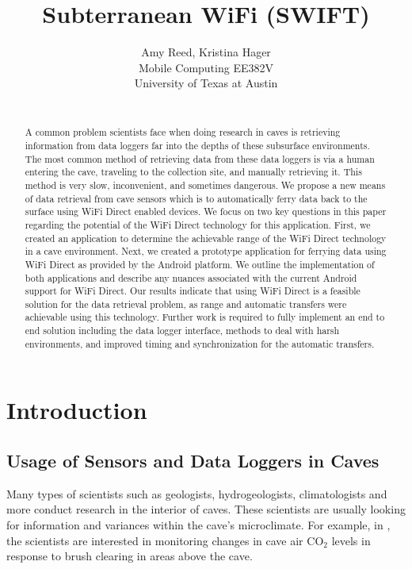 \documentclass[10pt,twocolumn]{article}
\begin{document}
\title{Subterranean WiFi (SWIFT)}

\author{Amy Reed, Kristina Hager\\
Mobile Computing EE382V\\
University of Texas at Austin\\
\\
}

\maketitle
\thispagestyle{empty}

\begin{abstract}
	A common problem scientists face when doing research in caves 
	is retrieving information from data loggers far into the depths of these subsurface environments.
	The most common method of retrieving data from these data loggers is via a human entering 
	the cave, traveling to the collection site, and manually retrieving it. 
	This method is very slow, inconvenient, and sometimes dangerous.
	We propose a new means of data retrieval from cave sensors which is to automatically 
	ferry data back to the surface using WiFi Direct enabled devices. 
	We focus on two key questions in this paper regarding the potential of the WiFi Direct technology for this application.
	First, we created an application to determine the achievable range of the WiFi Direct technology in a cave environment.
	Next, we created a prototype application for ferrying data using WiFi Direct as provided by the Android platform. 
	We outline the implementation of both applications and describe any nuances associated with the current Android 
	support for WiFi Direct.
	Our results indicate that using WiFi Direct is a feasible solution for the data retrieval problem, as range and automatic transfers were achievable using this technology.
	Further work is required to fully implement an end to end solution including the data logger interface, methods to deal with harsh environments, and improved timing and synchronization for the automatic transfers. 
\end{abstract}

\tableofcontents

\section{Introduction}

\subsection{Usage of Sensors and Data Loggers in Caves}
\label{sec:Usage of Sensors and Data Loggers in Caves}
Many types of scientists such as geologists, hydrogeologists, climatologists and more conduct research in the interior of caves. 
These scientists are usually looking for information and variances within the cave's microclimate. 
For example, in \cite{wong2010}, the scientists are interested in monitoring changes in cave air CO$_2$ levels in response to brush clearing in areas above the cave. 
\end{document}
